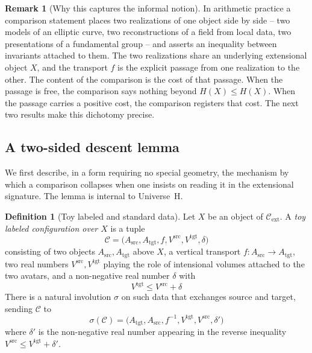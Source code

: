 \documentclass[10pt, reqno]{amsart}
\theoremstyle{plain}
\theoremstyle{definition}
\newtheorem{definition}[theorem]{Definition}
\newtheorem{remark}[theorem]{Remark}
\theoremstyle{plain}
\begin{document}
\begin{remark}[Why this captures the informal notion]\label{rem:WhyComparison}
In arithmetic practice a comparison statement places two realizations of one object side by side -- two models of an elliptic curve, two reconstructions of a field from local data, two presentations of a fundamental group -- and asserts an inequality between invariants attached to them. The two realizations share an underlying extensional object $X$, and the transport $f$ is the explicit passage from one realization to the other. The content of the comparison is the cost of that passage. When the passage is free, the comparison says nothing beyond $H(X) \le H(X)$. When the passage carries a positive cost, the comparison registers that cost. The next two results make this dichotomy precise.
\end{remark}

\subsection{A two-sided descent lemma}

We first describe, in a form requiring no special geometry, the mechanism by which a comparison collapses when one insists on reading it in the extensional signature. The lemma is internal to Universe~H.

\begin{definition}[Toy labeled and standard data]\label{def:ToyAliasedStandard}
Let $X$ be an object of $\mathcal{C}_{\mathrm{ext}}$. A \emph{toy labeled configuration over $X$} is a tuple
\[
  \mathcal{C} = \bigl(A_{\mathrm{src}}, A_{\mathrm{tgt}}, f, V^{\mathrm{src}}, V^{\mathrm{tgt}}, \delta\bigr)
\]
consisting of two objects $A_{\mathrm{src}}, A_{\mathrm{tgt}}$ above $X$, a vertical transport $f \colon A_{\mathrm{src}} \to A_{\mathrm{tgt}}$, two real numbers $V^{\mathrm{src}}, V^{\mathrm{tgt}}$ playing the role of intensional volumes attached to the two avatars, and a non-negative real number $\delta$ with
\[
  V^{\mathrm{tgt}} \le V^{\mathrm{src}} + \delta
\]
There is a natural involution $\sigma$ on such data that exchanges source and target, sending $\mathcal{C}$ to
\[
  \sigma(\mathcal{C}) = \bigl(A_{\mathrm{tgt}}, A_{\mathrm{src}}, f^{-1}, V^{\mathrm{tgt}}, V^{\mathrm{src}}, \delta'\bigr)
\]
where $\delta'$ is the non-negative real number appearing in the reverse inequality $V^{\mathrm{src}} \le V^{\mathrm{tgt}} + \delta'$.
\end{definition}
\end{document}
